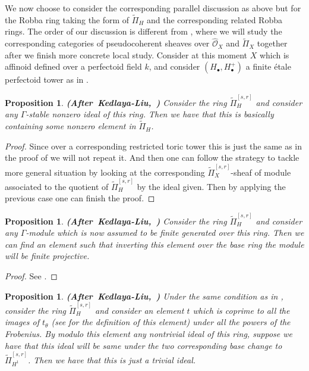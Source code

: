 \documentclass[12pt]{amsart}
\newtheorem{proposition}[theorem]{Proposition}
\theoremstyle{definition}
\numberwithin{equation}{section}
\begin{document}
	


\indent We now choose to consider the corresponding parallel discussion as above but for the Robba ring taking the form of $\widetilde{\Pi}_{H}$ and the corresponding related Robba rings. The order of our discussion is different from \cite{KL16}, where we will study the corresponding categories of pseudocoherent sheaves over $\widehat{\mathcal{O}}_X$ and $\widetilde{\Pi}_{X}$  together after we finish more concrete local study. Consider at this moment $X$ which is affinoid defined over a perfectoid field $k$, and consider $(H_\bullet,H_\bullet^+)$ a finite \'etale perfectoid tower as in \cite{KL16}. 


\begin{proposition} \mbox{\bf{(After Kedlaya-Liu, \cite[Lemma 8.7.3]{KL16})}}
Consider the ring $\widetilde{\Pi}^{[s,r]}_{H}$ and consider any $\Gamma$-stable nonzero ideal of this ring. Then we have that this is basically containing some nonzero element in $\widetilde{\Pi}_{H}$.	
\end{proposition}

\begin{proof}
Since over a corresponding restricted toric tower this is just the same as in the proof of \cite[Lemma 8.7.3]{KL16} we will not repeat it. And then one can follow the strategy to tackle more general situation by looking at the corresponding $\widetilde{\Pi}^{[s,r]}_X$-sheaf of module associated to the quotient of $\widetilde{\Pi}^{[s,r]}_H$ by the ideal given. Then by applying the previous case one can finish the proof.
\end{proof}



\begin{proposition} \mbox{\bf{(After Kedlaya-Liu, \cite[Corollary 8.7.4]{KL16})}}
Consider the ring $\widetilde{\Pi}^{[s,r]}_{H}$ and consider any $\Gamma$-module which is now assumed to be finite generated over this ring. Then we can find an element such that inverting this element over the base ring the module will be finite projective.	
\end{proposition}

\begin{proof}
See \cite[Corollary 8.7.4]{KL16}.
\end{proof}




\begin{proposition} \mbox{\bf{(After Kedlaya-Liu, \cite[Proposition 8.8.9]{KL16})}}
Under the same condition as in \cite[Proposition 8.8.9]{KL16}, consider the ring $\widetilde{\Pi}^{[s,r]}_{H}$ and consider an element $t$ which is coprime to all the images of $t_\theta$ (see \cite[Proposition 8.8.9]{KL16} for the definition of this element) under all the powers of the Frobenius. By modulo this element any nontrivial ideal of this ring, suppose we have that this ideal will be same under the two corresponding base change to $\widetilde{\Pi}^{[s,r]}_{H^1}$. Then we have that this is just a trivial ideal.
\end{proposition}
\end{document}
